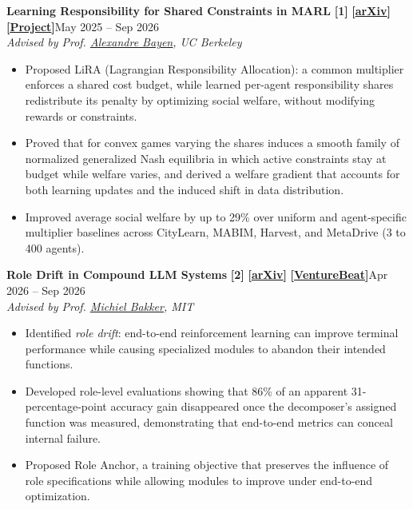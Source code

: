 \documentclass[10pt,letterpaper]{article}
\newcommand{\ulink}[2]{\href{#1}{\underline{#2}}}
\newcommand{\linktag}[2]{\textbf{[\ulink{#1}{#2}]}}
\newcommand{\project}[3]{%
  \vspace{6pt}%
  {#1}\hfill #2\\
  \textit{#3}\par\vspace{2pt}}
\begin{document}
\project{\textbf{Learning Responsibility for Shared Constraints in MARL} \textbf{[1]}
         \linktag{https://arxiv.org/abs/2610.07491}{arXiv} \linktag{https://lira-marl.github.io/}{Project}}{May 2025 -- Sep 2026}
        {Advised by Prof. \ulink{https://bayen.berkeley.edu/alex-bayen}{Alexandre Bayen}, UC Berkeley}
\begin{itemize}
  \item Proposed LiRA (Lagrangian Responsibility Allocation): a common multiplier enforces a shared cost budget, while
    learned per-agent responsibility shares redistribute its penalty by optimizing social welfare, without modifying
    rewards or constraints.
  \item Proved that for convex games varying the shares induces a smooth family of normalized generalized Nash equilibria
    in which active constraints stay at budget while welfare varies, and derived a welfare gradient that accounts for
    both learning updates and the induced shift in data distribution.
  \item Improved average social welfare by up to 29\% over uniform and agent-specific multiplier baselines across CityLearn,
    MABIM, Harvest, and MetaDrive (3 to 400 agents).
\end{itemize}

\project{\textbf{Role Drift in Compound LLM Systems} \textbf{[2]}
         \linktag{https://arxiv.org/abs/2607.21627}{arXiv}
         \linktag{https://venturebeat.com/ai/one-ai-module-faked-86-of-a-pipelines-accuracy-gains-by-feeding-another-the-answers}{VentureBeat}}{Apr 2026 -- Sep 2026}
        {Advised by Prof. \ulink{https://miba.dev/}{Michiel Bakker}, MIT}
\begin{itemize}
  \item Identified \textit{role drift}: end-to-end reinforcement learning can improve terminal performance while causing specialized
    modules to abandon their intended functions.
  \item Developed role-level evaluations showing that 86\% of an apparent 31-percentage-point accuracy gain disappeared
    once the decomposer's assigned function was measured, demonstrating that end-to-end metrics can conceal
    internal failure.
  \item Proposed Role Anchor, a training objective that preserves the influence of role specifications while allowing
    modules to improve under end-to-end optimization.
\end{itemize}
\end{document}
